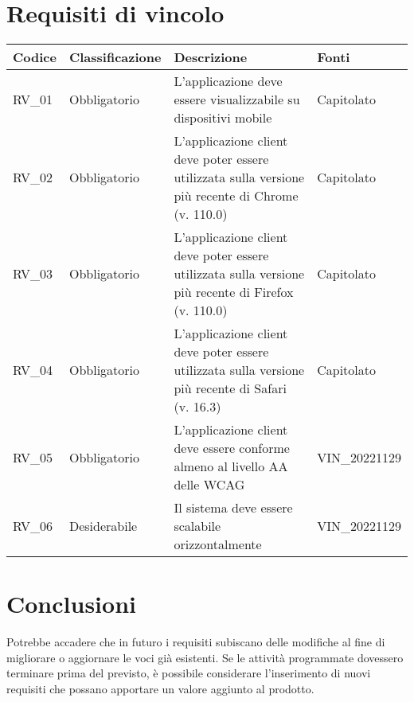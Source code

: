 \section{Requisiti di vincolo}

\begin{center}
    \begin{xltabular}{\linewidth}{|l|l|X|l|}
    \hline
    \textbf{Codice} & \textbf{Classificazione} & \textbf{Descrizione} & \textbf{Fonti} \\
    \hline
    RV\_01 & Obbligatorio & L'applicazione deve essere visualizzabile su dispositivi mobile & Capitolato \\

    \hline
    RV\_02 & Obbligatorio & L'applicazione client deve poter essere utilizzata sulla versione più recente di Chrome (v. 110.0) & Capitolato \\

    \hline
    RV\_03 & Obbligatorio & L'applicazione client deve poter essere utilizzata sulla versione più recente di Firefox (v. 110.0) & Capitolato \\

    \hline
    RV\_04 & Obbligatorio & L'applicazione client deve poter essere utilizzata sulla versione più recente di Safari (v. 16.3) & Capitolato \\

    \hline
    RV\_05 & Obbligatorio & L'applicazione client deve essere conforme almeno al livello AA delle WCAG  & VIN\_20221129 \\

    \hline
    RV\_06 & Desiderabile & Il sistema deve essere scalabile orizzontalmente  & VIN\_20221129 \\

    \hline

    \end{xltabular}
    \end{center}

\section{Conclusioni}

Potrebbe accadere che in futuro i requisiti subiscano delle modifiche al fine di migliorare o aggiornare le voci già esistenti.
Se le attività programmate dovessero terminare prima del previsto, è possibile considerare l'inserimento di nuovi requisiti che possano apportare un valore aggiunto al prodotto.
